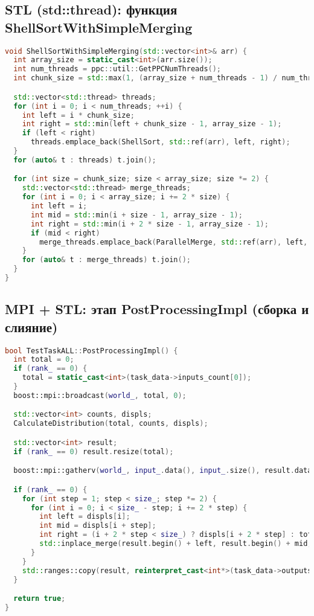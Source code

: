 \documentclass[12pt]{article}
\begin{document}
\subsection*{STL (std::thread): функция ShellSortWithSimpleMerging}
\begin{lstlisting}[language=C++]
void ShellSortWithSimpleMerging(std::vector<int>& arr) {
  int array_size = static_cast<int>(arr.size());
  int num_threads = ppc::util::GetPPCNumThreads();
  int chunk_size = std::max(1, (array_size + num_threads - 1) / num_threads);

  std::vector<std::thread> threads;
  for (int i = 0; i < num_threads; ++i) {
    int left = i * chunk_size;
    int right = std::min(left + chunk_size - 1, array_size - 1);
    if (left < right)
      threads.emplace_back(ShellSort, std::ref(arr), left, right);
  }
  for (auto& t : threads) t.join();

  for (int size = chunk_size; size < array_size; size *= 2) {
    std::vector<std::thread> merge_threads;
    for (int i = 0; i < array_size; i += 2 * size) {
      int left = i;
      int mid = std::min(i + size - 1, array_size - 1);
      int right = std::min(i + 2 * size - 1, array_size - 1);
      if (mid < right)
        merge_threads.emplace_back(ParallelMerge, std::ref(arr), left, mid, right);
    }
    for (auto& t : merge_threads) t.join();
  }
}
\end{lstlisting}

\subsection*{MPI + STL: этап PostProcessingImpl (сборка и слияние)}
\begin{lstlisting}[language=C++]
bool TestTaskALL::PostProcessingImpl() {
  int total = 0;
  if (rank_ == 0) {
    total = static_cast<int>(task_data->inputs_count[0]);
  }
  boost::mpi::broadcast(world_, total, 0);

  std::vector<int> counts, displs;
  CalculateDistribution(total, counts, displs);

  std::vector<int> result;
  if (rank_ == 0) result.resize(total);

  boost::mpi::gatherv(world_, input_.data(), input_.size(), result.data(), counts, displs, 0);

  if (rank_ == 0) {
    for (int step = 1; step < size_; step *= 2) {
      for (int i = 0; i < size_ - step; i += 2 * step) {
        int left = displs[i];
        int mid = displs[i + step];
        int right = (i + 2 * step < size_) ? displs[i + 2 * step] : total;
        std::inplace_merge(result.begin() + left, result.begin() + mid, result.begin() + right);
      }
    }
    std::ranges::copy(result, reinterpret_cast<int*>(task_data->outputs[0]));
  }

  return true;
}
\end{lstlisting}
\end{document}
